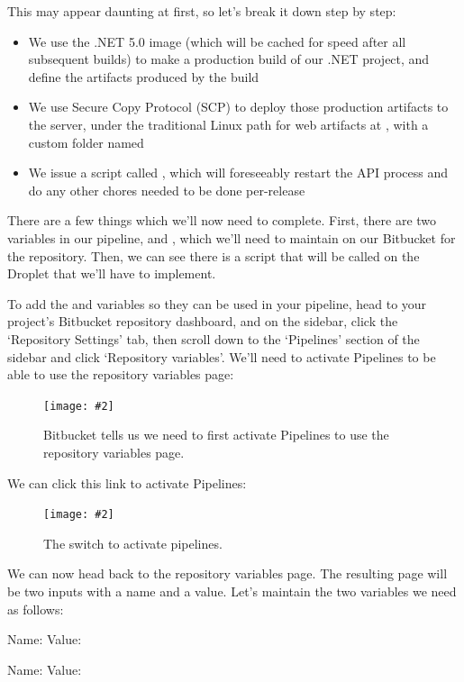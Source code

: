 \documentclass[a4paper,headinclude=on,footinclude=on,12pt,oneside]{scrbook}
\newcommand{\standardfigure}[3]{\begin{figure}[H]\begin{center}\texttt{[image: \#2]}\caption{#3}\label{fig:#2}\end{center}\end{figure}}
\begin{document}
This may appear daunting at first, so let's break it down step by step:

\begin{itemize}
  \item [Step 1:] We use the .NET 5.0 image (which will be cached for speed after all subsequent builds) to make a production build of our .NET project, and define the artifacts produced by the build
  \item [Step 2:] We use Secure Copy Protocol (SCP) to deploy those production artifacts to the server, under the traditional Linux path for web artifacts at , with a custom folder named 
  \item [Step 3:] We issue a script called , which will foreseeably restart the API process and do any other chores needed to be done per-release
\end{itemize}

There are a few things which we'll now need to complete. First, there are two variables in our pipeline,  and , which we'll need to maintain on our Bitbucket for the repository. Then, we can see there is a script  that will be called on the Droplet that we'll have to implement.


To add the  and  variables so they can be used in your pipeline, head to your project's Bitbucket repository dashboard, and on the sidebar, click the `Repository Settings' tab, then scroll down to the `Pipelines' section of the sidebar and click `Repository variables'. We'll need to activate Pipelines to be able to use the repository variables page:

\standardfigure{\textwidth}{backend/bitbucket/repository-variables-deactivated}{Bitbucket tells us we need to first activate Pipelines to use the repository variables page.}

We can click this link to activate Pipelines:

\standardfigure{\textwidth}{backend/bitbucket/enabled-pipelines}{The switch to activate pipelines.}

We can now head back to the repository variables page. The resulting page will be two inputs with a name and a value. Let's maintain the two variables we need as follows:

\begin{arrows}
  \item Name:  Value: 
  \item Name:  Value: 
\end{arrows}
\end{document}
